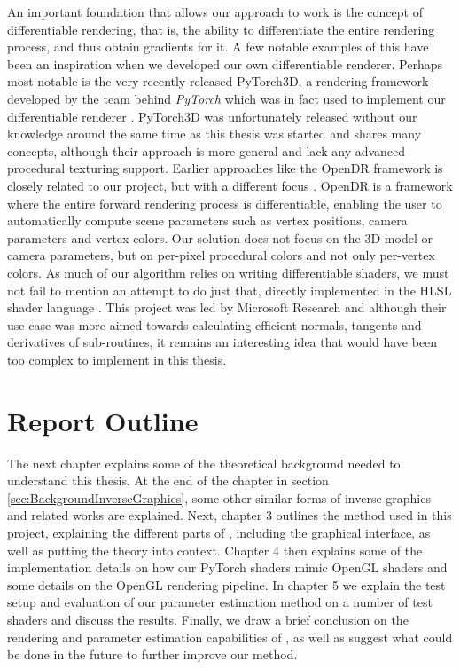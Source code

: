 An important foundation that allows our approach to work is the concept of differentiable rendering, that is, the ability to differentiate the entire rendering process, and thus obtain gradients for it. A few notable examples of this have been an inspiration when we developed our own differentiable renderer. Perhaps most notable is the very recently released PyTorch3D, a rendering framework developed by the team behind \textit{PyTorch} which was in fact used to implement our differentiable renderer \cite{facebookresearch_2020_facebookresearchpytorch3d, paszke_2019_pytorch}. PyTorch3D was unfortunately released without our knowledge around the same time as this thesis was started and shares many concepts, although their approach is more general and lack any advanced procedural texturing support. Earlier approaches like the OpenDR framework is closely related to our project, but with a different focus \cite{loper_2014_opendr}. OpenDR is a framework where the entire forward rendering process is differentiable, enabling the user to automatically compute scene parameters such as vertex positions, camera parameters and vertex colors. Our solution does not focus on the 3D model or camera parameters, but on per-pixel procedural colors and not only per-vertex colors. As much of our algorithm relies on writing differentiable shaders, we must not fail to mention an attempt to do just that, directly implemented in the HLSL shader language \cite{guenter_2011_symbolic}. This project was led by Microsoft Research and although their use case was more aimed towards calculating efficient normals, tangents and derivatives of sub-routines, it remains an interesting idea that would have been too complex to implement in this thesis.

\section{Report Outline}

The next chapter explains some of the theoretical background needed to understand this thesis. At the end of the chapter in section \ref{sec:BackgroundInverseGraphics}, some other similar forms of inverse graphics and related works are explained. Next, chapter 3 outlines the method used in this project, explaining the different parts of \dipter{}, including the graphical interface, as well as putting the theory into context. Chapter 4 then explains some of the implementation details on how our PyTorch shaders mimic OpenGL shaders and some details on the OpenGL rendering pipeline. In chapter 5 we explain the test setup and evaluation of our parameter estimation method on a number of test shaders and discuss the results. Finally, we draw a brief conclusion on the rendering and parameter estimation capabilities of \dipter{}, as well as suggest what could be done in the future to further improve our method.


